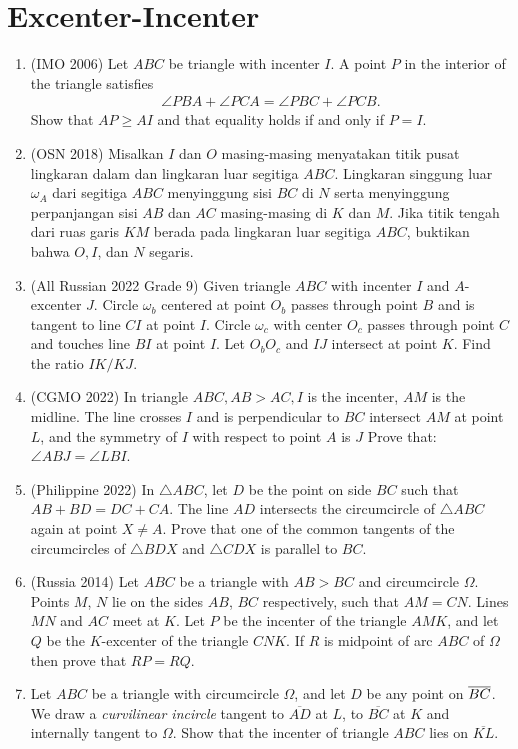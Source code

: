 \documentclass[12pt]{scrartcl}
\begin{document}
\section{Excenter-Incenter}
\begin{enumerate}
\item (IMO 2006) Let $ABC$ be triangle with incenter $I$. A point $P$ in the interior of the triangle satisfies
\begin{align*}
    \angle PBA + \angle PCA = \angle PBC + \angle PCB.
\end{align*}
Show that $AP \ge AI$ and that equality holds if and only if $P=I$.

\item (OSN 2018) Misalkan $I$ dan $O$ masing-masing menyatakan titik pusat lingkaran dalam dan lingkaran luar segitiga $ABC$. Lingkaran singgung luar $\omega_A$ dari segitiga $ABC$ menyinggung sisi $BC$ di $N$ serta menyinggung perpanjangan sisi $AB$ dan $AC$ masing-masing di $K$ dan $M$. Jika titik tengah dari ruas garis $KM$ berada pada lingkaran luar segitiga $ABC$, buktikan bahwa $O,I$, dan $N$ segaris.

\item (All Russian 2022 Grade 9) Given triangle $ABC$ with incenter $I$ and $A$-excenter $J$. Circle $\omega_b$ centered at point $O_b$ passes through point $B$ and is tangent to line $CI$ at point $I$. Circle $\omega_c$ with center $O_c$ passes through point $C$ and touches line $BI$ at point $I$. Let $O_bO_c$ and $IJ$ intersect at point $K$. Find the ratio $IK/KJ$.

\item (CGMO 2022) In triangle $ABC,AB>AC,I$ is the incenter, $AM$ is the midline. The line crosses $I$ and is perpendicular to $BC $ intersect $AM$ at point $L$, and the symmetry of $I$ with respect to point $A$ is $J$
Prove that: $\angle ABJ= \angle LBI$.

\item (Philippine 2022) In $\triangle ABC$, let $D$ be the point on side $BC$ such that $AB+BD=DC+CA.$ The line $AD$ intersects the circumcircle of $\triangle ABC$ again at point $X \neq A$. Prove that one of the common tangents of the circumcircles of $\triangle BDX$ and $\triangle CDX$ is parallel to $BC$.

\item 	(Russia 2014) Let $ABC$ be a triangle with $AB>BC$ and circumcircle $\Omega$. Points $M$, $N$ lie on the sides $AB$, $BC$ respectively, such that $AM=CN$. Lines $MN$ and $AC$ meet at $K$. Let $P$ be the incenter of the triangle $AMK$, and let $Q$ be the $K$-excenter of the triangle $CNK$. If $R$ is midpoint of arc $ABC$ of $\Omega$ then prove that $RP=RQ$.

\item Let $ABC$ be a triangle with circumcircle $\Omega$, and let $D$ be any point on $\overline{BC}$. We draw a \emph{curvilinear incircle} tangent to $\overline{AD}$ at $L$, to $\overline{BC}$ at $K$ and internally tangent to $\Omega$. Show that the incenter of triangle $ABC$ lies on $\overline{KL}$.
\end{enumerate}
\end{document}
